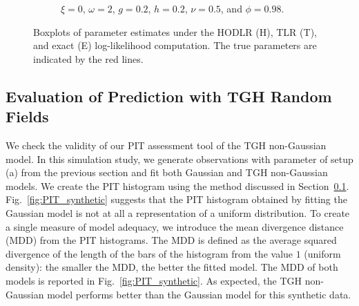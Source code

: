 \documentclass[conference]{IEEEtran}
\begin{document}
\begin{figure}[htp!]
\begin{subfigure}{0.45\textwidth}
  \caption{  $\xi = 0$, $\omega = 2$, $g = 0.2$, $h = 0.2$, $\nu = 0.5$, and $\phi = 0.98$.}
\end{subfigure}%
\caption{Boxplots of parameter estimates under the HODLR (H), TLR (T), and exact (E) log-likelihood computation. The true parameters are indicated by the red lines.}
\label{fig:boxplot}
\end{figure}

\subsection{Evaluation of Prediction with TGH Random Fields}
\label{sec:pit}
We check the validity of our PIT assessment tool of the TGH non-Gaussian model. In this simulation study, we generate observations with parameter of setup (a) from the previous section and fit both Gaussian and TGH non-Gaussian models. We create the PIT histogram using the method discussed in Section~\ref{sec:pit}. Fig.~\ref{fig:PIT_synthetic} suggests that the PIT histogram obtained by fitting the Gaussian model is not at all a representation of a uniform distribution. To create a single measure of model adequacy, we introduce the mean divergence distance (MDD) from the PIT histograms. The MDD is defined as the average squared divergence of the length of the bars of the histogram from the value $1$ (uniform density): the smaller the MDD, the better the fitted model. The MDD of both models is reported in Fig.~\ref{fig:PIT_synthetic}. As expected, the TGH non-Gaussian model performs better than the Gaussian model for this synthetic data.
\end{document}
